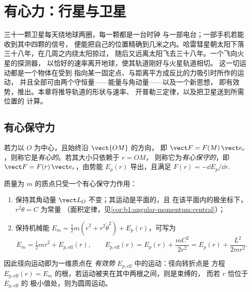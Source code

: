 \chapter{有心力：行星与卫星}\label{ch:b1:central-forces}

三十一颗卫星每天绕地球两圈，每一颗都是一台时钟
与一部电台；一部手机若能收到其中四颗的信号，
便能把自己的位置精确到几米之内。哈雷彗星朝太阳下落
三十八年，在几周之内绕太阳掠过，
随后又远离太阳飞去三十八年。一个飞向火星的探测器，
以恰好的速率离开地球，使其轨道刚好与火星轨道相切。
这一切运动都是一个物体在受到
指向某一固定点、与距离平方成反比的力吸引时所作的运动，
并且全部可由两个守恒量——能量与角动量——以及一个新思想，
即有效势，推出。本章将推导轨道的形状与速率、
开普勒三定律，以及把卫星送到所需位置的
计算。

\section{有心保守力}

\begin{definition}\label{def:b1:central-forces:central}
若力以 $O$ 为中心，且始终沿 $\vect{OM}$ 的方向，
即 $\vect F = F(M)\,\vect e_r$，则称它是\emph{有心的}。若其大小只依赖于 $r = OM$，
则称它为\emph{有心保守的}，即 $\vect F =
F(r)\,\vect e_r$，由势能 $E_p(r)$ 导出，且满足
$F(r) = -\dd E_p/\dd r$.
\end{definition}

\begin{theorem}[有心保守力下的运动]\label{thm:b1:central-forces:reduction}
质量为 $m$ 的质点只受一个有心保守力作用：
\begin{enumerate}
  \item 保持其角动量 $\vect L_O$ 不变；其运动是平面的，且
        在该平面内的极坐标下，$r^2\dot\theta = C$ 为常量
        （面积定律，见\cref{cor:b1:angular-momentum:central}）；
  \item 保持机械能 $E_m = \tfrac12 m(\dot r^2 + r^2\dot\theta^2)
        + E_p(r)$，可写为
        \[
        E_m = \tfrac12 m\dot r^2 + E_{p,\mathrm{eff}}(r), \qquad
        E_{p,\mathrm{eff}}(r) = E_p(r) + \frac{mC^2}{2r^2} = E_p(r) + \frac{L^2}{2mr^2} .
        \]
\end{enumerate}
因此径向运动即为一维质点在
\emph{有效势} $E_{p,\mathrm{eff}}$ 中的运动：径向转折点是
方程 $E_{p,\mathrm{eff}}(r) = E_m$ 的根，若运动被夹在其中两根之间，则是束缚的，
而若 $r$ 恰位于 $E_{p,\mathrm{eff}}$ 的
极小值处，则为圆周运动。
\end{theorem}

